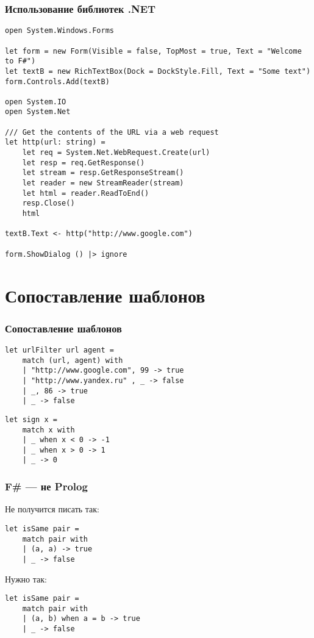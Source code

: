 \documentclass[xetex,mathserif,serif]{beamer}
\begin{document}
    \begin{frame}[fragile]
        \frametitle{Использование библиотек .NET}
        \begin{scriptsize}
            \begin{verbatim}
open System.Windows.Forms

let form = new Form(Visible = false, TopMost = true, Text = "Welcome to F#")
let textB = new RichTextBox(Dock = DockStyle.Fill, Text = "Some text")
form.Controls.Add(textB)

open System.IO
open System.Net

/// Get the contents of the URL via a web request
let http(url: string) =
    let req = System.Net.WebRequest.Create(url)
    let resp = req.GetResponse()
    let stream = resp.GetResponseStream()
    let reader = new StreamReader(stream)
    let html = reader.ReadToEnd()
    resp.Close()
    html

textB.Text <- http("http://www.google.com")

form.ShowDialog () |> ignore
            \end{verbatim}
        \end{scriptsize}
    \end{frame}

    \section{Сопоставление шаблонов}
    
    \begin{frame}[fragile]
        \frametitle{Сопоставление шаблонов}
        \begin{verbatim}
let urlFilter url agent =
    match (url, agent) with
    | "http://www.google.com", 99 -> true
    | "http://www.yandex.ru" , _ -> false
    | _, 86 -> true
    | _ -> false
        \end{verbatim}

        \begin{verbatim}
let sign x =
    match x with
    | _ when x < 0 -> -1
    | _ when x > 0 -> 1
    | _ -> 0
        \end{verbatim}
    \end{frame}

    \begin{frame}[fragile]
        \frametitle{F\# --- не Prolog}
        Не получится писать так:
        \begin{verbatim}
let isSame pair =
    match pair with
    | (a, a) -> true
    | _ -> false
        \end{verbatim}
        Нужно так:
        \begin{verbatim}
let isSame pair =
    match pair with
    | (a, b) when a = b -> true
    | _ -> false
        \end{verbatim}
    \end{frame}
\end{document}
